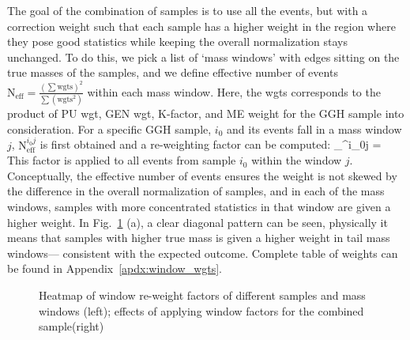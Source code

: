 The goal of the combination of samples is to use all the events, but with a correction weight
such that each sample has a higher weight in the region where they pose good statistics
while keeping the overall normalization stays unchanged. To do this, we pick a list of
`mass windows' with edges sitting on the true masses of the samples, and we define effective
number of events $\mathrm{N}_\mathrm{eff} = \frac{(\sum\mathrm{wgts})^2}{\sum(\mathrm{wgts}^2)}$
within each mass window. Here, the wgts corresponds to the product of PU wgt, GEN wgt, K-factor, and ME weight for
the GGH sample into consideration. For a specific GGH sample, $i_0$ and its events fall in a mass 
window $j$, $\mathrm{N}_\mathrm{eff}^{i_0j}$ is first obtained and a re-weighting factor can be computed:
\be
{}_^{i_0j} = 
\ee
This factor is applied to all events from sample $i_0$ within the window $j$. Conceptually,
the effective number of events ensures the weight is not skewed by the difference in the overall
normalization of samples, and in each of the mass windows, samples with more concentrated
statistics in that window are given a higher weight. In Fig.~\ref{fig:window_wgt_matrix} (a), a
clear diagonal pattern can be seen, physically it means that samples with higher true 
mass is given a higher weight in tail mass windows--- consistent with the expected outcome. Complete
table of weights can be found in Appendix~\ref{apdx:window_wgts}.
\begin{figure}[htb]
    \begin{center}
    \end{center}
    \caption{Heatmap of window re-weight factors of different samples and mass windows (left);
    effects of applying window factors for the combined sample(right)}
    \label{fig:window_wgt_matrix}
\end{figure}

